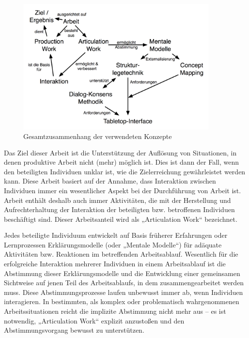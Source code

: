 \begin{figure}[htbp]
	\centering
	\includegraphics[width=0.9\textwidth]{img/Schlussbetrachtungen/ArbeitInteraktionMentaleModelleTabletop.png}
	\caption{Gesamtzusammenhang der verwendeten Konzepte}
	\label{fig:img_Schlussbetrachtungen_ArbeitInteraktionMentaleModelleTabletop}
\end{figure}

Das Ziel dieser Arbeit ist die Unterstützung der Auflösung von Situationen, in denen produktive Arbeit nicht (mehr) möglich ist. Dies ist dann der Fall, wenn den beteiligten Individuen unklar ist, wie die Zielerreichung gewährleistet werden kann. Diese Arbeit basiert auf der Annahme, dass Interaktion zwischen Individuen immer ein wesentlicher Aspekt bei der Durchführung von Arbeit ist. Arbeit enthält deshalb auch immer Aktivitäten, die mit der Herstellung und Aufrechterhaltung der Interaktion der beteiligten bzw. betroffenen Individuen beschäftigt sind. Dieser Arbeitsanteil wird als „Articulation Work“ bezeichnet. 

Jedes beteiligte Individuum entwickelt auf Basis früherer Erfahrungen oder Lernprozessen Erklärungsmodelle (oder „Mentale Modelle“) für adäquate Aktivitäten bzw. Reaktionen im betreffenden Arbeitsablauf. Wesentlich für die erfolgreiche Interaktion mehrerer Individuen in einem Arbeitsablauf ist die Abstimmung dieser Erklärungsmodelle und die Entwicklung einer gemeinsamen Sichtweise auf jenen Teil des Arbeitsablaufs, in dem zusammengearbeitet werden muss. Diese Abstimmungsprozesse laufen unbewusst immer ab, wenn Individuen interagieren. In bestimmten, als komplex oder problematisch wahrgenommenen Arbeitssituationen reicht die implizite Abstimmung nicht mehr aus -- es ist notwendig, „Articulation Work“ explizit anzustoßen und den Abstimmungsvorgang bewusst zu unterstützen. 

